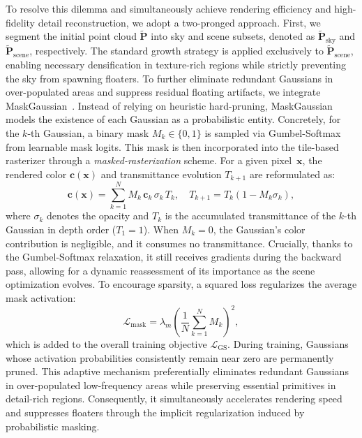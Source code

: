 \documentclass{article} %
\begin{document}
To resolve this dilemma and simultaneously achieve rendering efficiency and high-fidelity detail reconstruction, we adopt a two-pronged approach. 
First, we segment the initial point cloud $\mathbf{\tilde{P}}$ into sky and scene subsets, denoted as $\mathbf{\tilde{P}}_{\mathrm{sky}}$ and $\mathbf{\tilde{P}}_{\mathrm{scene}}$, respectively. The standard growth strategy is applied exclusively to $\mathbf{\tilde{P}}_{\mathrm{scene}}$, enabling necessary densification in texture-rich regions while strictly preventing the sky from spawning floaters.
To further eliminate redundant Gaussians in over-populated areas and suppress residual floating artifacts, we integrate MaskGaussian~\citep{liu2025maskgaussian}.
Instead of relying on heuristic hard-pruning, MaskGaussian models the existence of each Gaussian as a probabilistic entity.
Concretely, for the $k$-th Gaussian, a binary mask $M_k \in \{0, 1\}$ is sampled via Gumbel-Softmax~\citep{jang2016categorical} from learnable mask logits. 
This mask is then incorporated into the tile-based rasterizer through a \emph{masked-rasterization} scheme. 
For a given pixel~$\mathbf{x}$, the rendered color $\mathbf{c}(\mathbf{x})$ and transmittance evolution $T_{k+1}$ are reformulated as:
\begin{equation}
  \mathbf{c}(\mathbf{x}) = \sum_{k=1}^{N} M_k \, \mathbf{c}_k \, \sigma_k \, T_k, \quad
  T_{k+1} = T_k ( 1 - M_k \sigma_k ),
  \label{eq:mask_raster}
\end{equation}
where $\sigma_k$ denotes the opacity and $T_k$ is the accumulated transmittance of the $k$-th Gaussian in depth order ($T_1 = 1$). When $M_k = 0$, the Gaussian's color contribution is negligible, and it consumes no transmittance. Crucially, thanks to the Gumbel-Softmax relaxation, it still receives gradients during the backward pass, allowing for a dynamic reassessment of its importance as the scene optimization evolves. To encourage sparsity, a squared loss regularizes the average mask activation:
\begin{equation}
  \mathcal{L}_{\mathrm{mask}} = \lambda_m \left(\frac{1}{N}\sum_{k=1}^{N}M_k\right)^{\!2},
  \label{eq:L_mask}
\end{equation}
which is added to the overall training objective $\mathcal{L}_{\mathrm{GS}}$. During training, Gaussians whose activation probabilities consistently remain near zero are permanently pruned. This adaptive mechanism preferentially eliminates redundant Gaussians in over-populated low-frequency areas while preserving essential primitives in detail-rich regions. Consequently, it simultaneously accelerates rendering speed and suppresses floaters through the implicit regularization induced by probabilistic masking.
\end{document}
